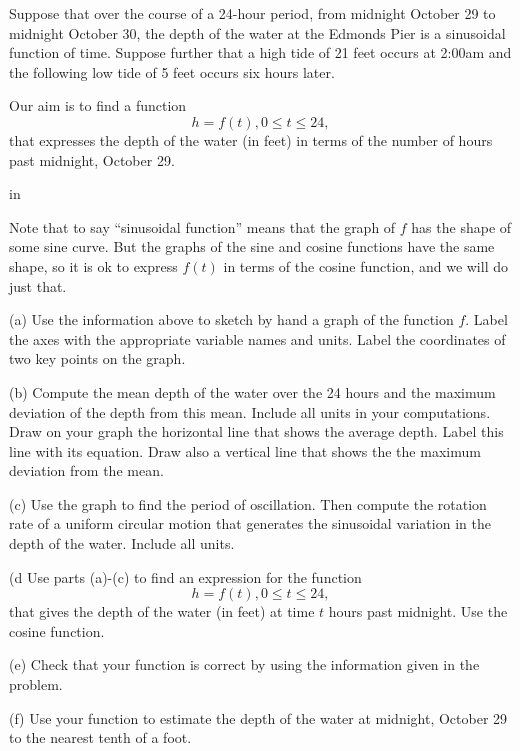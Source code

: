 \documentclass{ximera}
\newcommand{\pskip}{\vskip 0.1 in}
\begin{document}
\begin{example} \label{Ex4:Graphs}
Suppose that over the course of a 24-hour period, from midnight October 29 to midnight October 30, the depth of the water at the Edmonds Pier is a sinusoidal function of time. Suppose further that a high tide of 21 feet occurs at 2:00am and the following low tide of 5 feet occurs six hours later. 

Our aim is to find a function
\[
    h = f(t) , 0\leq t \leq 24, 
\]
that expresses the depth of the water (in feet) in terms of the number of hours past midnight, October 29. 

\pskip

Note that to say ``sinusoidal function'' means that the graph of $f$ has the shape of some sine curve. But the graphs of the sine and cosine functions have the same shape, so it is ok to express $f(t)$ in terms of the cosine function, and we will do just that.



(a) Use the information above to sketch by hand a graph of the function $f$. Label the axes with the appropriate variable names and units. Label the coordinates of two key points on the graph.

(b) Compute the mean depth of the water over the 24 hours and the maximum deviation of the depth from this mean. Include all units in your computations. Draw on your graph the horizontal line that shows the average depth. Label this line with its equation. Draw also a vertical line that shows the the maximum deviation from the mean.

(c) Use the graph to find the period of oscillation. Then compute the rotation rate of a uniform circular motion that generates the sinusoidal variation in the depth of the water. Include all units.

(d Use parts (a)-(c) to find an expression for the function 
\[
   h = f(t) ,  0\leq t \leq 24, 
\]
that gives the depth of the water (in feet) at time $t$ hours past midnight. Use the cosine function.

(e) Check that your function is correct by using the information given in the problem.

(f) Use your function to estimate the depth of the water at midnight, October 29 to the nearest tenth of a foot.


\end{example}
\end{document}
